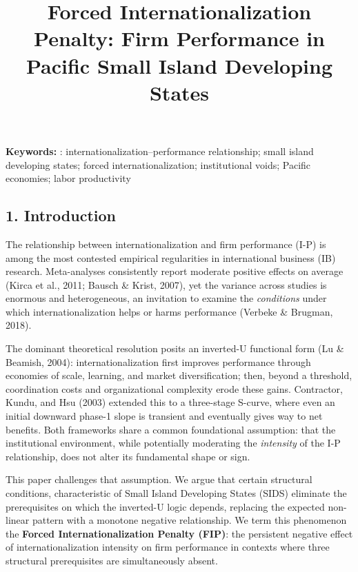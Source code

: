 \documentclass[
  12pt,a4paper]{article}
\title{Forced Internationalization Penalty: Firm Performance in Pacific
Small Island Developing States}
\author{}
\date{}
\begin{document}
\maketitle

\textbf{Keywords:} : internationalization--performance relationship;
small island developing states; forced internationalization;
institutional voids; Pacific economies; labor productivity

\hypertarget{introduction}{%
\subsection{1. Introduction}\label{introduction}}

The relationship between internationalization and firm performance (I-P)
is among the most contested empirical regularities in international
business (IB) research. Meta-analyses consistently report moderate
positive effects on average (Kirca et al., 2011; Bausch \& Krist, 2007),
yet the variance across studies is enormous and heterogeneous, an
invitation to examine the \emph{conditions} under which
internationalization helps or harms performance (Verbeke \& Brugman,
2018).

The dominant theoretical resolution posits an inverted-U functional form
(Lu \& Beamish, 2004): internationalization first improves performance
through economies of scale, learning, and market diversification; then,
beyond a threshold, coordination costs and organizational complexity
erode these gains. Contractor, Kundu, and Hsu (2003) extended this to a
three-stage S-curve, where even an initial downward phase-1 slope is
transient and eventually gives way to net benefits. Both frameworks
share a common foundational assumption: that the institutional
environment, while potentially moderating the \emph{intensity} of the
I-P relationship, does not alter its fundamental shape or sign.

This paper challenges that assumption. We argue that certain structural
conditions, characteristic of Small Island Developing States (SIDS)
eliminate the prerequisites on which the inverted-U logic depends,
replacing the expected non-linear pattern with a monotone negative
relationship. We term this phenomenon the \textbf{Forced
Internationalization Penalty (FIP)}: the persistent negative effect of
internationalization intensity on firm performance in contexts where
three structural prerequisites are simultaneously absent.
\end{document}
